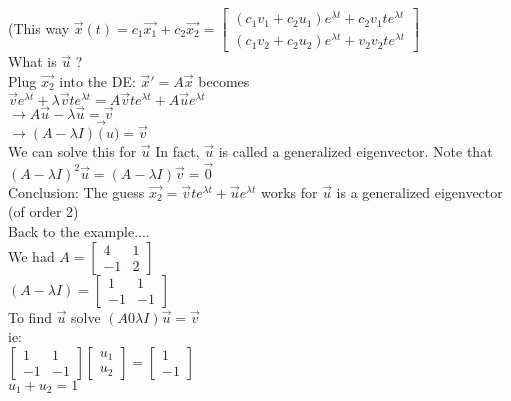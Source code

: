 \documentclass[12pt]{article}
\begin{document}
	(This way $\overrightarrow{x}(t) = c_1\overrightarrow{x_1} + c_2\overrightarrow{x_2} = \begin{bmatrix}
	(c_1v_1 + c_2u_1)e^{\lambda t} + c_2v_1te^{\lambda t} \\
	(c_1v_2 + c_2u_2)e^{\lambda t} + v_2v_2te^{\lambda t}
	\end{bmatrix}$\\
	What is $\overrightarrow{u}$ ?\\
	
	Plug $\overrightarrow{x_2}$ into the DE: $\overrightarrow{x}' = A\overrightarrow{x}$ becomes \\
	$\overrightarrow{v}e^{\lambda t} + \lambda\overrightarrow{v}te^{\lambda t} = A\overrightarrow{v}te^{\lambda t} + A\overrightarrow{u}e^{\lambda t}$\\
	$\rightarrow A\overrightarrow{u} - \lambda\overrightarrow{u} = \overrightarrow{v}$\\
	$\rightarrow (A-\lambda I)\overrightarrow(u) = \overrightarrow{v}$\\
	
	We can solve this for $\overrightarrow{u}$ In fact, $\overrightarrow{u}$ is called a generalized eigenvector. Note that $(A-\lambda I)^2 \overrightarrow{u} = (A-\lambda I)\overrightarrow{v} = \overrightarrow{0}$\\
	Conclusion: The guess $\overrightarrow{x_2} = \overrightarrow{v}te^{\lambda t} + \overrightarrow{u}e^{\lambda t}$ works for $\overrightarrow{u}$ is a generalized eigenvector (of order 2)\\
	
	Back to the example....\\
	
	We had $A = \begin{bmatrix}
	4 & 1 \\ -1 & 2
	\end{bmatrix}$\\
	$(A - \lambda I) = \begin{bmatrix}
	1 & 1 \\ -1 & -1
	\end{bmatrix}$\\
	
	To find $\overrightarrow{u}$ solve $(A 0 \lambda I)\overrightarrow{u} = \overrightarrow{v}$\\
	ie: \\
	$\begin{bmatrix}
	1 & 1 \\ -1 & -1
	\end{bmatrix}
	\begin{bmatrix}
	u_1 \\ u_2
	\end{bmatrix} =
	\begin{bmatrix}
	1 \\ -1
	\end{bmatrix}$\\
	$u_1 + u_2 = 1$\\
	
\end{document}
